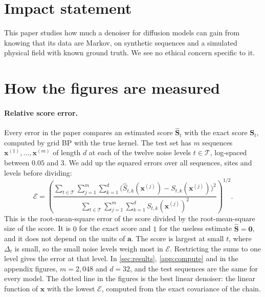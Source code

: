 \documentclass{article}
\begin{document}
\section*{Impact statement}
This paper studies how much a denoiser for diffusion models can gain from knowing that its data are Markov, on
synthetic sequences and a simulated physical field with known ground truth. We see no ethical concern specific to it.




\newpage
\appendix
\onecolumn
\let\appendixsection\section
\renewcommand{\section}{\FloatBarrier\appendixsection}
\section{How the figures are measured}
\label{app:measures}

\paragraph{Relative score error.} Every error in the paper compares an estimated score $\widehat{\mathbf S}_t$ with
the exact score $\mathbf S_t$, computed by grid BP with the true kernel. The test set has $m$ sequences
$\mathbf x^{(1)},\ldots,\mathbf x^{(m)}$ of length $d$ at each of the twelve noise levels $t\in\mathcal T$, log-spaced
between $0.05$ and $3$. We add up the squared errors over all sequences, sites and levels before dividing:
\begin{equation}
  \mathcal E
  =\left(
  \frac{\sum_{t\in\mathcal T}\sum_{j=1}^{m}\sum_{k=1}^{d}
        \big(\widehat S_{t,k}(\mathbf x^{(j)})-S_{t,k}(\mathbf x^{(j)})\big)^2}
       {\sum_{t\in\mathcal T}\sum_{j=1}^{m}\sum_{k=1}^{d}
        S_{t,k}(\mathbf x^{(j)})^2}
  \right)^{1/2}.
  \label{eq:rel-error}
\end{equation}
This is the root-mean-square error of the score divided by the root-mean-square size of the score. It is $0$ for the
exact score and $1$ for the useless estimate $\widehat{\mathbf S}=\mathbf 0$, and it does not depend on the units of
$\mathbf a$. The score is largest at small $t$, where $\Delta_t$ is small, so the small noise levels weigh most in
$\mathcal E$. Restricting the sums to one level gives the error at that level. In \cref{sec:results}, \cref{app:compute} and in
the appendix figures, $m=2{,}048$ and $d=32$, and the test sequences are the same for every model. The dotted line in
the figures is the best linear denoiser: the linear function of $\mathbf x$ with the lowest $\mathcal E$, computed from
the exact covariance of the chain.
\end{document}
